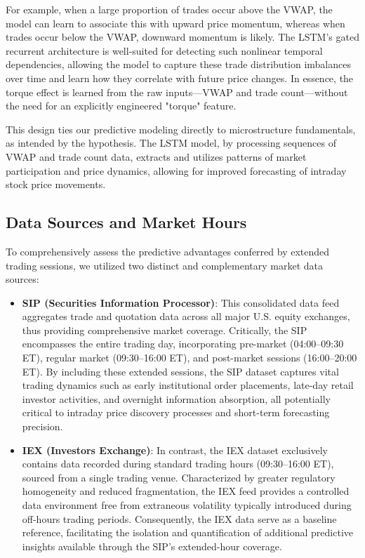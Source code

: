 \documentclass[letterpaper]{article}
\begin{document}
For example, when a large proportion of trades occur above the VWAP, the model can learn to associate this with upward price momentum, whereas when trades occur below the VWAP, downward momentum is likely. The LSTM's gated recurrent architecture is well-suited for detecting such nonlinear temporal dependencies, allowing the model to capture these trade distribution imbalances over time and learn how they correlate with future price changes. In essence, the torque effect is learned from the raw inputs—VWAP and trade count—without the need for an explicitly engineered "torque" feature.

This design ties our predictive modeling directly to microstructure fundamentals, as intended by the hypothesis. The LSTM model, by processing sequences of VWAP and trade count data, extracts and utilizes patterns of market participation and price dynamics, allowing for improved forecasting of intraday stock price movements.

\subsection{Data Sources and Market Hours}

To comprehensively assess the predictive advantages conferred by extended trading sessions, we utilized two distinct and complementary market data sources: 

\begin{itemize}
    \item \textbf{SIP (Securities Information Processor)}: This consolidated data feed aggregates trade and quotation data across all major U.S. equity exchanges, thus providing comprehensive market coverage. Critically, the SIP encompasses the entire trading day, incorporating pre-market (04:00–09:30 ET), regular market (09:30–16:00 ET), and post-market sessions (16:00–20:00 ET). By including these extended sessions, the SIP dataset captures vital trading dynamics such as early institutional order placements, late-day retail investor activities, and overnight information absorption, all potentially critical to intraday price discovery processes and short-term forecasting precision.
    
    \item \textbf{IEX (Investors Exchange)}: In contrast, the IEX dataset exclusively contains data recorded during standard trading hours (09:30–16:00 ET), sourced from a single trading venue. Characterized by greater regulatory homogeneity and reduced fragmentation, the IEX feed provides a controlled data environment free from extraneous volatility typically introduced during off-hours trading periods. Consequently, the IEX data serve as a baseline reference, facilitating the isolation and quantification of additional predictive insights available through the SIP’s extended-hour coverage.
\end{itemize}
\end{document}
